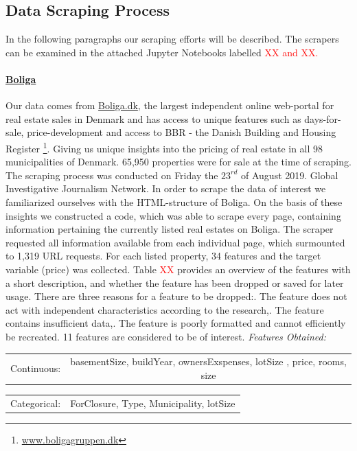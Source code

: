 \documentclass[12pt,a4paper]{article}
\begin{document}
\subsection{Data Scraping Process}
In the following paragraphs our scraping efforts will be described. The scrapers can be examined in the attached Jupyter Notebooks labelled \textcolor{red}{XX and XX.} 
\paragraph{\href{https://www.boliga.dk}{Boliga}\newline}
Our data comes from \href{https://www.boliga.dk}{Boliga.dk}, the largest independent online web-portal for real estate sales in Denmark and has access to unique features such as days-for-sale, price-development and access to BBR - the Danish Building and Housing Register \footnote{\href{https://www.boligagruppen.dk}{www.boligagruppen.dk}}. Giving us unique insights into the pricing of real estate in all 98 municipalities of Denmark. 65,950 properties were for sale at the time of scraping.\newline
The scraping process was conducted on Friday the $23^{rd}$ of August 2019. Global Investigative Journalism Network. In order to scrape the data of interest we familiarized ourselves with the HTML-structure of Boliga. On the basis of these insights we constructed a code, which was able to scrape every page, containing information pertaining the currently listed real estates on Boliga. The scraper requested all information available from each individual page, which surmounted to 1,319 URL requests. \newline
For each listed property, 34 features and the target variable (price) was collected. Table \textcolor{red}{XX} provides an overview of the features with a short description, and whether the feature has been dropped or saved for later usage. There are three reasons for a feature to be dropped:. The feature does not act with independent characteristics according to the research,. The feature contains insufficient data,. The feature is poorly formatted and cannot efficiently be recreated. 
11 features are considered to be of interest.
\vspace*{10px} \newline
\textit{Features Obtained:} \newline
\begin{tabular}{c c}
Continuous: & basementSize, buildYear, ownersExspenses, lotSize	, price, rooms, size  \\	
\end{tabular}\newline 
\begin{tabular}{c c}
Categorical: & ForClosure, Type, Municipality, lotSize	 \\	
\end{tabular}
\end{document}
